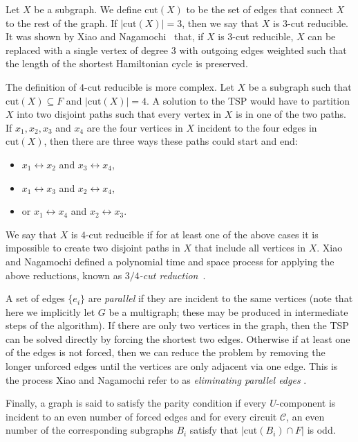 Let $X$ be a subgraph. We define $\text{cut}(X)$ to be the set of edges that connect $X$ to the rest of the graph. If $|\text{cut}(X)| = 3$, then we say that $X$ is $3$-cut reducible. It was shown by Xiao and Nagamochi~\cite{xiao2016degree3} that, if $X$ is 3-cut reducible, $X$ can be replaced with a single vertex of degree $3$ with outgoing edges weighted such that the length of the shortest Hamiltonian cycle is preserved.

The definition of $4$-cut reducible is more complex. Let $X$ be a subgraph such that $\text{cut}(X) \subseteq F$ and $|\text{cut}(X)| = 4$. A solution to the TSP would have to partition $X$ into two disjoint paths such that every vertex in $X$ is in one of the two paths. If $x_1, x_2, x_3$ and $x_4$ are the four vertices in $X$ incident to the four edges in $\text{cut}(X)$, then there are three ways these paths could start and end:
%
\begin{itemize}
\item $x_1 \leftrightarrow x_2$ and $x_3 \leftrightarrow x_4$,
\item $x_1 \leftrightarrow x_3$ and $x_2 \leftrightarrow x_4$,
\item or $x_1 \leftrightarrow x_4$ and $x_2 \leftrightarrow x_3$.
\end{itemize}
%
We say that $X$ is $4$-cut reducible if for at least one of the above cases it is impossible to create two disjoint paths in $X$ that include all vertices in $X$. Xiao and Nagamochi defined a polynomial time and space process for applying the above reductions, known as {\em $3/4$-cut reduction}~\cite{xiao2016degree3}.

A set of edges $\{e_i\}$ are {\em parallel} if they are incident to the same vertices (note that here we implicitly let $G$ be a multigraph; these may be produced in intermediate steps of the algorithm). If there are only two vertices in the graph, then the TSP can be solved directly by forcing the shortest two edges. Otherwise if at least one of the edges is not forced, then we can reduce the problem by removing the longer unforced edges until the vertices are only adjacent via one edge. This is the process Xiao and Nagamochi refer to as {\em eliminating parallel edges} \cite{xiao2016degree3}.

Finally, a graph is said to satisfy the parity condition if every $U$-component is incident to an even number of forced edges and for every circuit $\mathcal{C}$, an even number of the corresponding subgraphs $B_i$ satisfy that $|\text{cut}(B_i) \cap F|$ is odd.

